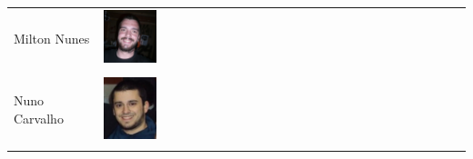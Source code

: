 \begin{titlepage}
\begin{center}
\end{center}
\newpage
\thispagestyle{empty} %
\begin{center}
  \vspace*{\fill}
  \begin{tabular}{m{3cm} m{0.5cm}}
    Milton Nunes & \includegraphics[width=0.15\textwidth]{img/grupo/milton}\\ \\
    Nuno Carvalho & \includegraphics[width=0.15\textwidth]{img/grupo/teddy}\\ \\
  \end{tabular}
  \vspace*{\fill}
\end{center}
\end{titlepage}
